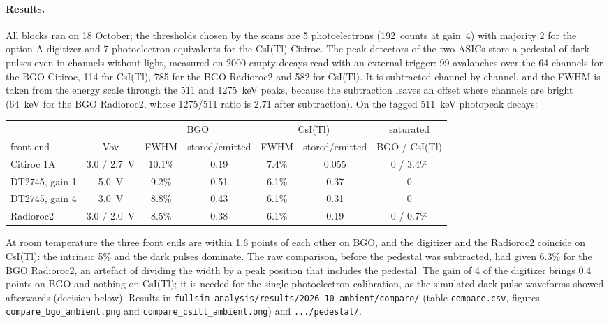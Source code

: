 \documentclass[11pt]{article}
\newcommand{\code}[1]{\texttt{#1}}
\newcommand{\csitl}{CsI(Tl)\xspace}
\begin{document}
\paragraph{Results.} All blocks ran on 18 October; the thresholds chosen by
the scans are 5 photoelectrons (192~counts at gain~4) with majority 2 for
the option-A digitizer and 7 photoelectron-equivalents for the \csitl
Citiroc. The peak detectors of the two ASICs store a pedestal of dark
pulses even in channels without light, measured on 2000 empty decays read
with an external trigger: 99 avalanches over the 64 channels for the BGO
Citiroc, 114 for \csitl, 785 for the BGO Radioroc2 and 582 for \csitl. It
is subtracted channel by channel, and the FWHM is taken from the energy
scale through the 511 and 1275~keV peaks, because the subtraction leaves an
offset where channels are bright (64~keV for the BGO Radioroc2, whose
1275/511 ratio is 2.71 after subtraction). On the tagged 511~keV
photopeak decays:

\begin{center}
\footnotesize
\begin{tabular}{l c c c c c c}
\toprule
 & & \multicolumn{2}{c}{BGO} & \multicolumn{2}{c}{\csitl} & saturated \\
front end & Vov & FWHM & stored/emitted & FWHM & stored/emitted & BGO / \csitl \\
\midrule
Citiroc 1A & 3.0 / 2.7~V & 10.1\% & 0.19 & 7.4\% & 0.055 & 0 / 3.4\% \\
DT2745, gain 1 & 5.0~V & 9.2\% & 0.51 & 6.1\% & 0.37 & 0 \\
DT2745, gain 4 & 3.0~V & 8.8\% & 0.43 & 6.1\% & 0.31 & 0 \\
Radioroc2 & 3.0 / 2.0~V & 8.5\% & 0.38 & 6.1\% & 0.19 & 0 / 0.7\% \\
\bottomrule
\end{tabular}
\end{center}

At room temperature the three front ends are within 1.6 points of each
other on BGO, and the digitizer and the Radioroc2 coincide on \csitl: the
intrinsic 5\% and the dark pulses dominate. The raw comparison, before the
pedestal was subtracted, had given 6.3\% for the BGO Radioroc2, an artefact
of dividing the width by a peak position that includes the pedestal. The
gain of 4 of the digitizer brings 0.4 points on BGO and nothing on \csitl;
it is needed for the single-photoelectron calibration, as the simulated
dark-pulse waveforms showed afterwards (decision below). Results in
\code{fullsim\_analysis/results/2026-10\_ambient/compare/} (table
\code{compare.csv}, figures \code{compare\_bgo\_ambient.png} and
\code{compare\_csitl\_ambient.png}) and \code{.../pedestal/}.
\end{document}
